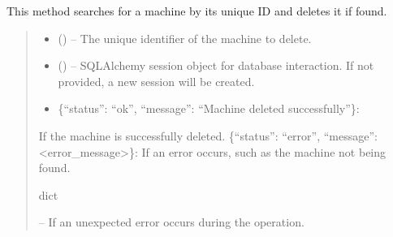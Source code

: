 \documentclass[letterpaper,10pt,english]{sphinxmanual}
\begin{document}
\begin{fulllineitems}
\begin{fulllineitems}
\sphinxAtStartPar
This method searches for a machine by its unique ID and deletes it if found.
\begin{quote}\begin{description}
\begin{itemize}
\item {} 
\sphinxAtStartPar
{} () – The unique identifier of the machine to delete.

\item {} 
\sphinxAtStartPar
{} (\sphinxstyleliteralemphasis{\sphinxupquote{, }}) – SQLAlchemy session object for database interaction.
If not provided, a new session will be created.

\end{itemize}

\sphinxAtStartPar
\begin{description}
\begin{itemize}
\item {} 
\sphinxAtStartPar
\{“status”: “ok”, “message”: “Machine deleted successfully”\}:

\end{itemize}

\sphinxAtStartPar
If the machine is successfully deleted.
\sphinxhyphen{} \{“status”: “error”, “message”: <error\_message>\}:
If an error occurs, such as the machine not being found.

\end{description}


\sphinxAtStartPar
dict

\sphinxAtStartPar
{} – If an unexpected error occurs during the operation.

\end{description}\end{quote}

\end{fulllineitems}



\end{fulllineitems}
\end{document}
